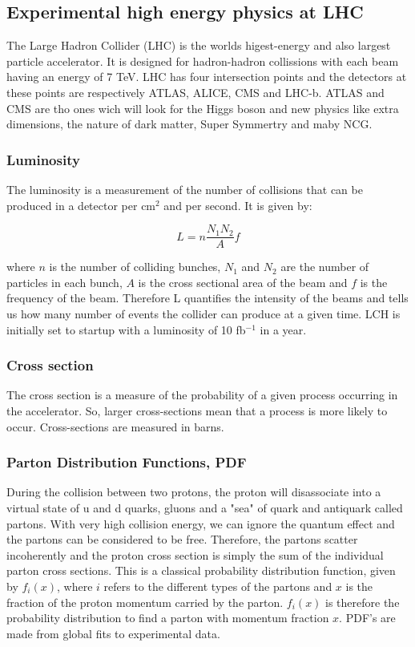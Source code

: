 \subsection{Experimental high energy physics at LHC}
The Large Hadron Collider (LHC) is the worlds higest-energy and also largest particle accelerator. It is designed for hadron-hadron collissions with each beam having an energy of 7 TeV. LHC has four intersection points and the detectors at these points are respectively ATLAS, ALICE, CMS and LHC-b. ATLAS and CMS are tho ones wich will look for the Higgs boson and new physics like extra dimensions, the nature of dark matter, Super Symmertry and maby NCG. 

\subsubsection{Luminosity}
The luminosity is a measurement of the number of collisions that can be produced in a detector per cm$^{2}$ and per second. It is given by:

\begin{equation}
L=n\frac{N_{1}N_{2}}{A}f
\end{equation}

where $n$ is the number of colliding bunches, $N_{1}$ and $N_{2}$ are the number of particles in each bunch, $A$ is the cross sectional area of the beam and $f$ is the frequency of the beam. Therefore L quantifies the intensity of the beams and tells us how many number of events the collider can produce at a given time. LCH is initially set to startup with a luminosity of 10 fb$^{-1}$ in a year.

\subsubsection{Cross section}
The cross section is a measure of the probability of a given process occurring in the accelerator. So, larger cross-sections mean that a process is more likely to occur. Cross-sections are measured in barns.

\subsubsection{Parton Distribution Functions, PDF}
During the collision between two protons, the proton will disassociate into a virtual state of u and d quarks, gluons and a "sea" of quark and antiquark called partons. With very high collision energy, we can ignore the quantum effect and the partons can be considered to be free. Therefore, the partons scatter incoherently and the proton cross section is simply the sum of the individual parton cross sections. This is a classical probability distribution function, given by $f_{i}(x)$, where $i$ refers to the different types of the partons and $x$ is the fraction of the proton momentum carried by the parton\cite{green2005hpp}. $f_{i}(x)$ is therefore the probability distribution to find a parton with momentum fraction $x$. PDF's are made from global fits to experimental data.

